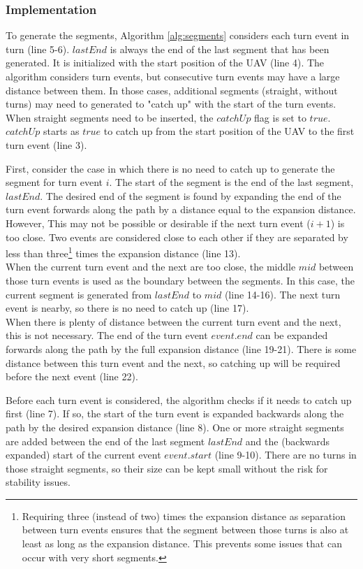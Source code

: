 \subsubsection{Implementation}
To generate the segments, Algorithm \ref{alg:segments} considers each turn event in turn (line 5-6). $lastEnd$ is always the end of the last segment that has been generated. It is initialized with the start position of the UAV (line 4). The algorithm considers turn events, but consecutive turn events may have a large distance between them. In those cases, additional segments (straight, without turns) may need to generated to "catch up" with the start of the turn events. When straight segments need to be inserted, the $catchUp$ flag is set to $true$. $catchUp$ starts as $true$ to catch up from the start position of the UAV to the first turn event (line 3).
\par
First, consider the case in which there is no need to catch up to generate the segment for turn event $i$. The start of the segment is the end of the last segment, $lastEnd$. The desired end of the segment is found by expanding the end of the turn event forwards along the path by a distance equal to the expansion distance. However, This may not be possible or desirable if the next turn event ($i+1$) is too close. Two events are considered close to each other if they are separated by less than three\footnote{Requiring three (instead of two) times the expansion distance as separation between turn events ensures that the segment between those turns is also at least as long as the expansion distance. This prevents some issues that can occur with very short segments.} times the expansion distance (line 13). \\
When the current turn event and the next are too close, the middle $mid$ between those turn events is used as the boundary between the segments. In this case, the current segment is generated from $lastEnd$ to $mid$ (line 14-16). The next turn event is nearby, so there is no need to catch up (line 17). \\
When there is plenty of distance between the current turn event and the next, this is not necessary. The end of the turn event $event.end$ can be expanded forwards along the path by the full expansion distance (line 19-21). There is some distance between this turn event and the next, so catching up will be required before the next event (line 22). \\
\par
Before each turn event is considered, the algorithm checks if it needs to catch up first (line 7). If so, the start of the turn event is expanded backwards along the path by the desired expansion distance (line 8). One or more straight segments are added between the end of the last segment $lastEnd$ and the (backwards expanded) start of the current event $event.start$ (line 9-10). There are no turns in those straight segments, so their size can be kept small without the risk for stability issues.

